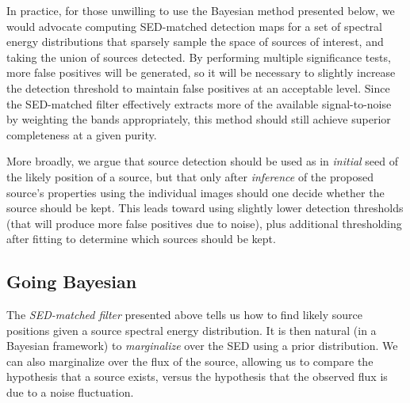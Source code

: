 \documentclass[11pt,letterpaper,linenumbers]{aastex7}
\begin{document}
In practice, for those unwilling to use the Bayesian method presented
below, we would advocate computing SED-matched detection maps for a
set of spectral energy distributions that sparsely sample the space of
sources of interest, and taking the union of sources detected.  By
performing multiple significance tests, more false positives will be
generated, so it will be necessary to slightly increase the
detection threshold to maintain false positives at an acceptable
level.  Since the SED-matched filter effectively extracts more of the available
signal-to-noise by weighting the bands appropriately, this method
should still achieve superior completeness at a given purity.

More broadly, we argue that source detection should be used as in
\emph{initial} seed of the likely position of a source, but that only
after \emph{inference} of the proposed source's properties using the
individual images should one decide whether the source should be kept.
This leads toward using slightly lower detection thresholds (that will
produce more false positives due to noise), plus additional
thresholding after fitting to determine which sources should be kept.


\subsection{Going Bayesian}
\label{sec:bayessed}

The \emph{SED-matched filter} presented above tells us how to find
likely source positions given a source spectral energy distribution.
It is then natural (in a Bayesian framework) to \emph{marginalize}
over the SED using a prior distribution.  We can also marginalize over
the flux of the source, allowing us to compare the hypothesis that a
source exists, versus the hypothesis that the observed flux is due to
a noise fluctuation.
\end{document}
